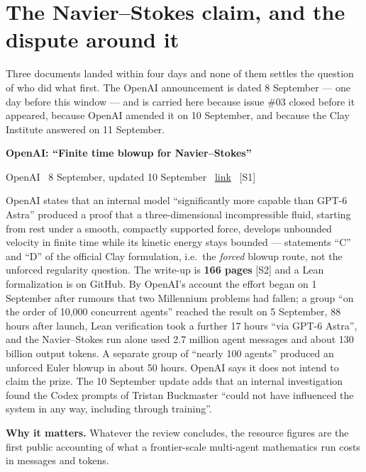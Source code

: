 \documentclass[11pt,a4paper]{article}
\newcommand{\entry}[4]{%
  \par\vspace{0.7em}%
  \Needspace*{5\baselineskip}%
  {\sffamily\bfseries\color{brandink}#1}\par
  {\footnotesize\color{brandgrey}#2 \textbullet\ \href{#3}{link} \textbullet\ \srcref{#4}}\par
  \vspace{0.15em}}
\newcommand{\why}[1]{\par{\small\textbf{Why it matters.} #1}\par}
\newcommand{\srcref}[1]{\textcolor{brandaccent}{[S#1]}}
\begin{document}
\section{The Navier--Stokes claim, and the dispute around it}

Three documents landed within four days and none of them settles the question of who did
what first. The OpenAI announcement is dated 8 September --- one day before this window
--- and is carried here because issue \#03 closed before it appeared, because OpenAI
amended it on 10 September, and because the Clay Institute answered on 11 September.

\entry{OpenAI: ``Finite time blowup for Navier--Stokes''}{OpenAI \textbullet\ 8 September, updated 10 September}{https://openai.com/index/navier-stokes-solution/}{1}
OpenAI states that an internal model ``significantly more capable than GPT-6 Astra'' produced
a proof that a three-dimensional incompressible fluid, starting from rest under a smooth,
compactly supported force, develops unbounded velocity in finite time while its kinetic
energy stays bounded --- statements ``C'' and ``D'' of the official Clay formulation, i.e.\ the
\emph{forced} blowup route, not the unforced regularity question. The write-up is
\textbf{166 pages} \srcref{2} and a Lean formalization is on GitHub. By OpenAI's account the
effort began on 1 September after rumours that two Millennium problems had fallen; a group
``on the order of 10{,}000 concurrent agents'' reached the result on 5 September, 88 hours
after launch, Lean verification took a further 17 hours ``via GPT-6 Astra'', and the
Navier--Stokes run alone used 2.7 million agent messages and about 130 billion output
tokens. A separate group of ``nearly 100 agents'' produced an unforced Euler blowup in about
50 hours. OpenAI says it does not intend to claim the prize. The 10 September update adds
that an internal investigation found the Codex prompts of Tristan Buckmaster ``could not have
influenced the system in any way, including through training''.
\why{Whatever the review concludes, the resource figures are the first public accounting
of what a frontier-scale multi-agent mathematics run costs in messages and tokens.}
\end{document}
